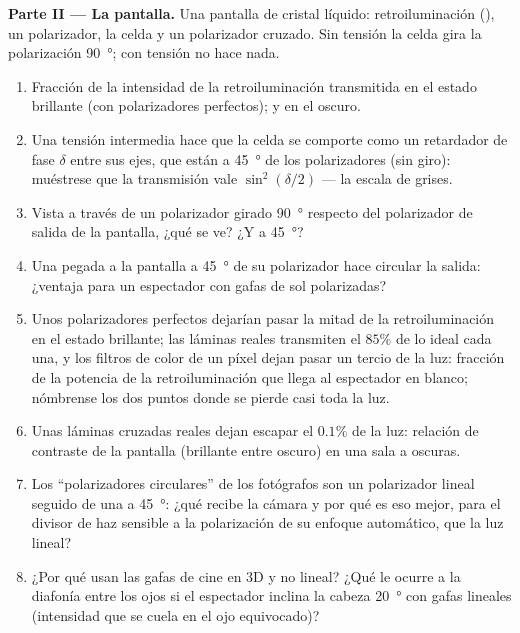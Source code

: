 \begin{problem}
\medskip
\noindent\textbf{Parte II --- La pantalla.}
Una pantalla de cristal líquido: retroiluminación (), un
polarizador, la celda y un polarizador cruzado. Sin tensión la celda gira
la polarización \qty{90}{\degree}; con tensión no hace nada.
\begin{enumerate}[resume]
  \item Fracción de la intensidad de la retroiluminación transmitida en el
        estado brillante (con polarizadores perfectos); y en el oscuro.
  \item Una tensión intermedia hace que la celda se comporte como un
        retardador de fase $\delta$ entre sus ejes, que están a
        \qty{45}{\degree} de los polarizadores (sin giro): muéstrese que la
        transmisión vale $\sin^2(\delta/2)$ --- la escala de grises.
  \item Vista a través de un polarizador girado \qty{90}{\degree} respecto
        del polarizador de salida de la pantalla, ¿qué se ve? ¿Y a
        \qty{45}{\degree}?
  \item Una  pegada a la pantalla a
        \qty{45}{\degree} de su polarizador hace circular la salida:
        ¿ventaja para un espectador con gafas de sol polarizadas?
  \item Unos polarizadores perfectos dejarían pasar la mitad de la
        retroiluminación en el estado brillante; las láminas reales
        transmiten el $85\%$ de lo ideal cada una, y los filtros de color
        de un píxel dejan pasar un tercio de la luz: fracción de la
        potencia de la retroiluminación que llega al espectador en blanco;
        nómbrense los dos puntos donde se pierde casi toda la luz.
  \item Unas láminas cruzadas reales dejan escapar el $0.1\%$ de la luz:
        relación de contraste de la pantalla (brillante entre oscuro) en
        una sala a oscuras.
  \item Los ``polarizadores circulares'' de los fotógrafos son un
        polarizador lineal seguido de una  a
        \qty{45}{\degree}: ¿qué recibe la cámara y por qué es eso mejor,
        para el divisor de haz sensible a la polarización de su enfoque
        automático, que la luz lineal?
  \item ¿Por qué usan las gafas de cine en 3D  y no
        lineal? ¿Qué le ocurre a la diafonía entre los ojos si el
        espectador inclina la cabeza \qty{20}{\degree} con gafas lineales
        (intensidad que se cuela en el ojo equivocado)?
\end{enumerate}


\end{problem}
